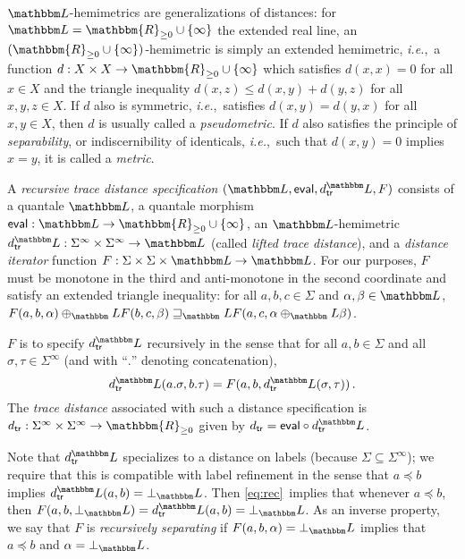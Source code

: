 \documentclass[twocolumn]{svjour3-dummy}
\newcommand*\labpre{\preccurlyeq}
\newcommand*\ie{\textit{i.e.},}
\newcommand*\Real{\mathbbm{R}}
\newcommand*\LL{\mathbbm L}
\newcommand*\Realnn{\Real_{ \ge 0}}
\newcommand*\eval{\textup{\textsf{eval}}}
\newcommand*\td{d_\textup{\textsf{tr}}} \newcommand*\tdl{\td^\LL}
\begin{document}
$\LL$-hemimetrics are generalizations of distances: for $\LL=
\Realnn\cup\{ \infty\}$ the extended real line, an $( \Realnn\cup\{
\infty\})$-hemimetric is simply an extended hemimetric, \ie~a function
$d: X\times X\to \Realnn\cup\{ \infty\}$ which satisfies $d( x, x)= 0$
for all $x\in X$ and the triangle inequality $d( x, z)\le d( x, y)+ d(
y, z)$ for all $x, y, z\in X$.  If $d$ also is symmetric,
\ie~satisfies $d( x, y)= d( y, x)$ for all $x, y\in X$, then $d$ is
usually called a \emph{pseudometric}.  If $d$ also satisfies the
principle of \emph{separability}, or indiscernibility of identicals,
\ie~such that $d( x, y)= 0$ implies $x= y$, it is called a
\emph{metric}.

A \emph{recursive trace distance specification} $( \LL, \eval, \tdl,
F)$ consists of a quantale $\LL$, a quantale morphism $\eval: \LL\to
\Realnn\cup\{ \infty\}$, an $\LL$-hemimetric $\tdl:
\Sigma^\infty\times \Sigma^\infty\to \LL$ (called \emph{lifted trace
  distance}), and a \emph{distance iterator} function $F: \Sigma\times
\Sigma\times \LL\to \LL$.  For our purposes, $F$ must be monotone in
the third and anti-monotone in the second coordinate and satisfy an
extended triangle inequality: for all $a, b, c\in \Sigma$ and $\alpha,
\beta\in \LL$, $F( a, b, \alpha)\oplus_\LL F( b, c,
\beta)\sqsupseteq_\LL F( a, c, \alpha\oplus_\LL \beta)$.

$F$ is to specify $\tdl$ recursively in the sense that for all $a, b\in
\Sigma$ and all $\sigma, \tau\in \Sigma^\infty$ (and with ``$.$''
denoting concatenation),
\begin{equation}
  \label{eq:rec}
  \tdl( a. \sigma, b. \tau)= F( a, b, \tdl( \sigma, \tau))\,.
\end{equation}
The \emph{trace distance} associated with such a distance specification
is $\td: \Sigma^\infty\times \Sigma^\infty\to \Realnn$ given by $\td=
\eval\circ \tdl$.

Note that $\tdl$ specializes to a distance on labels (because
$\Sigma\subseteq \Sigma^\infty$); we require that this is compatible
with label refinement in the sense that $a\labpre b$ implies $\tdl( a,
b)= \bot_\LL$.  Then \eqref{eq:rec}~implies that whenever $a\labpre b$,
then $F( a, b, \bot_\LL)= \tdl( a, b)= \bot_\LL$.  As an inverse
property, we say that $F$ is \emph{recursively separating} if $F( a, b,
\alpha)= \bot_\LL$ implies that $a\labpre b$ and $\alpha= \bot_\LL$.
\end{document}
